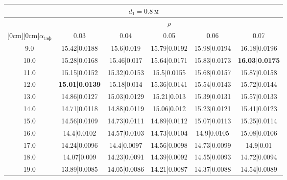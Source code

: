 \documentclass[20pt]{article}
\begin{document}
\begin{center}
\begin{tabular}{c|ccccc}
\hline
	\multicolumn{6}{c}{$d_{1}=0.8 \ м$} \\
\hline
	 & \multicolumn{5}{|c}{$\rho$} \\
	\cline{2-6}
	\raisebox{1.5ex}[0cm][0cm]{$\alpha_{1эф}$} & 0.03 & 0.04 & 0.05 & 0.06 & 0.07\\
\hline
	9.0 & 	15.42|0.0188 & 	15.6|0.019 & 	15.79|0.0192 & 	15.98|0.0194 & 	16.18|0.0196\\
	10.0 & 	15.28|0.0168 & 	15.46|0.017 & 	15.64|0.0171 & 	15.83|0.0173 & 	\textbf{16.03|0.0175}\\
	11.0 & 	15.15|0.0152 & 	15.32|0.0153 & 	15.5|0.0155 & 	15.68|0.0157 & 	15.87|0.0158\\
	12.0 & 	\textbf{15.01|0.0139} & 	15.18|0.014 & 	15.36|0.0141 & 	15.54|0.0143 & 	15.72|0.0144\\
	13.0 & 	14.86|0.0127 & 	15.03|0.0129 & 	15.21|0.013 & 	15.39|0.0131 & 	15.57|0.0133\\
	14.0 & 	14.71|0.0118 & 	14.88|0.0119 & 	15.06|0.012 & 	15.23|0.0121 & 	15.41|0.0123\\
	15.0 & 	14.56|0.0109 & 	14.73|0.0111 & 	14.89|0.0112 & 	15.07|0.0113 & 	15.25|0.0114\\
	16.0 & 	14.4|0.0102 & 	14.57|0.0103 & 	14.73|0.0104 & 	14.9|0.0105 & 	15.08|0.0106\\
	17.0 & 	14.24|0.0096 & 	14.4|0.0097 & 	14.56|0.0098 & 	14.73|0.0099 & 	14.9|0.01\\
	18.0 & 	14.07|0.009 & 	14.23|0.0091 & 	14.39|0.0092 & 	14.55|0.0093 & 	14.72|0.0094\\
	19.0 & 	13.89|0.0085 & 	14.05|0.0086 & 	14.21|0.0087 & 	14.37|0.0088 & 	14.54|0.0089\\
\end{tabular}


\end{center}
\end{document}
